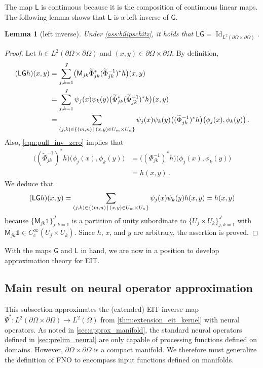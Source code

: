 \documentclass[pdflatex,sn-mathphys-num]{sn-jnl-preprint}
\let\originalleft\left %
\let\originalright\right
\renewcommand{\left}{\mathopen{}\mathclose\bgroup\originalleft}
\renewcommand{\right}{\aftergroup\egroup\originalright}
\newcommand{\sfG}{\mathsf{G}}
\newcommand{\sfL}{\mathsf{L}}
\newcommand{\sfM}{\mathsf{M}}
\newcommand{\pOmega}{{\partial\Omega}}
\newcommand{\set}[2]{{\left\{ #1 \,\middle|\, #2 \right\}}}
\DeclareMathOperator{\Id}{Id} %
\newcommand{\onebm}{\mathds{1}} %
\theoremstyle{thmstyleone}%
\newtheorem{lemma}[theorem]{Lemma}%
\theoremstyle{thmstyletwo}%
\theoremstyle{thmstylethree}%
\numberwithin{equation}{section}
\numberwithin{theorem}{section}
\begin{document}
The map $\sfL$ is continuous because it is the composition of continuous linear maps.
The following lemma shows that ${\sfL}$ is a left inverse of ${\sfG}$.
\begin{lemma}[left inverse]\label{lem:left_inv_pou}
Under \cref{ass:bilipschitz}, it holds that ${\sfL}{\sfG}=\Id_{L^2(\pOmega\times\pOmega)}$.
\end{lemma}
\begin{proof}
    Let $h\in L^2(\pOmega\times\pOmega)$ and $(x,y)\in\pOmega\times\pOmega$. By definition,
    \begin{align*}
        ({\sfL}{\sfG}h)(x,y)&=\sum_{j,k=1}^J \bigl(\sfM_{jk}\widetilde{\Phi}_{jk}^*(\widetilde{\Phi}_{jk}^{-1})^* h\bigr)(x,y)\\
        &=\sum_{j,k=1}^J \psi_j(x)\psi_k(y)\bigl(\widetilde{\Phi}_{jk}^*(\widetilde{\Phi}_{jk}^{-1})^* h\bigr)(x,y)\\
        &=\sum_{(j,k)\in\set{(m,n)}{(x,y)\in U_m\times U_n}}
        \psi_j(x)\psi_k(y)\bigl((\widetilde{\Phi}_{jk}^{-1})^* h\bigr)\bigl(\phi_j(x),\phi_k(y)\bigr)\,.
    \end{align*}
    Also, \eqref{eqn:pull_inv_zero} implies that
    \begin{align*}
        \bigl((\widetilde{\Phi}_{jk}^{-1})^* h\bigr)\bigl(\phi_j(x),\phi_k(y)\bigr)&=\bigl(({\Phi}_{jk}^{-1})^* h\bigr)\bigl(\phi_j(x),\phi_k(y)\bigr)\\
        &=h(x,y)\,.
    \end{align*}
    We deduce that
    \begin{align*}
        ({\sfL}{\sfG}h)(x,y)=\sum_{(j,k)\in\set{(m,n)}{(x,y)\in U_m\times U_n}}
        \psi_j(x)\psi_k(y) h(x,y)=h(x,y)
    \end{align*}
    because $\{\sfM_{jk}\onebm\}_{j,k=1}^J$ is a partition of unity subordinate to $\{U_j\times U_k\}_{j,k=1}^J$ with $\sfM_{jk}\onebm\in C_c^\infty(U_j\times U_k)$. Since $h$, $x$, and $y$ are arbitrary, the assertion is proved.
\end{proof}

With the maps $\sfG$ and $\sfL$ in hand, we are now in a position to develop approximation theory for EIT.


\subsection{Main result on neural operator approximation}\label{sec:approx_main}
This subsection approximates the (extended) EIT inverse map $\widetilde{\Psi}^\star\colon L^2(\pOmega\times\pOmega)\to L^2(\Omega)$ from \cref{thm:extension_eit_kernel} with neural operators. As noted in \cref{sec:approx_manifold}, the standard neural operators defined in \cref{sec:prelim_neural} are only capable of processing functions defined on domains. However, $\pOmega\times\pOmega$ is a compact manifold. We therefore must generalize the definition of FNO to encompass input functions defined on manifolds.
\end{document}
